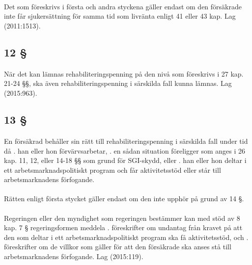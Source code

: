 \documentclass[a4paper,notitlepage,openany,10pt]{book}
\begin{document}
\paragraph*{}
Det som föreskrivs i första och andra styckena gäller endast om den försäkrade inte får sjukersättning för samma tid som livränta enligt 41 eller 43 kap.
Lag (2011:1513).
\subsection*{12 §}
\paragraph*{}
När det kan lämnas rehabiliteringspenning på den nivå som föreskrivs i 27 kap. 21-24 §§, ska även rehabiliteringspenning i särskilda fall kunna lämnas.
Lag (2015:963).
\subsection*{13 §}
\paragraph*{}
En försäkrad behåller sin rätt till rehabiliteringspenning i särskilda fall under tid då
. han eller hon förvärvsarbetar,
. en sådan situation föreligger som anges i 26 kap. 11, 12, eller 14-18 §§ som grund för SGI-skydd, eller
. han eller hon deltar i ett arbetsmarknadspolitiskt program och får aktivitetsstöd eller står till arbetsmarknadens förfogande.
\paragraph*{}
Rätten enligt första stycket gäller endast om den inte upphör på grund av 14 §.
\paragraph*{}
Regeringen eller den myndighet som regeringen bestämmer kan med stöd av 8 kap. 7 § regeringsformen meddela
. föreskrifter om undantag från kravet på att den som deltar i ett arbetsmarknadspolitiskt program ska få aktivitetsstöd, och
. föreskrifter om de villkor som gäller för att den försäkrade ska anses stå till arbetsmarknadens förfogande.
Lag (2015:119).
\end{document}
